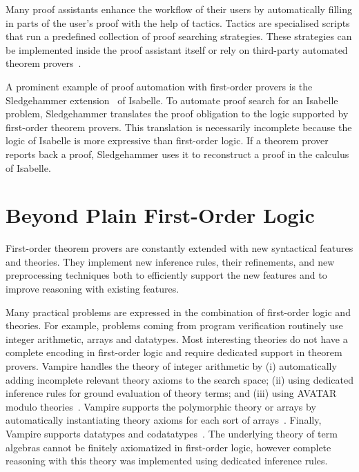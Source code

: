 Many proof assistants enhance the workflow of their users by automatically filling in parts of the user's proof with the help of tactics. Tactics are specialised scripts that run a predefined collection of proof searching strategies. These strategies can be implemented inside the proof assistant itself or rely on third-party automated theorem provers~\cite{Sledgehammer,DBLP:conf/icms/UrbanHV10}.

A prominent example of proof automation with first-order provers is the Sledgehammer extension~\cite{Sledgehammer} of Isabelle. To automate proof search for an Isabelle problem, Sledgehammer translates the proof obligation to the logic supported by first-order theorem provers. This translation is necessarily incomplete because the logic of Isabelle is more expressive than first-order logic. If a theorem prover reports back a proof, Sledgehammer uses it to reconstruct a proof in the calculus of Isabelle.

\section*{Beyond Plain First-Order Logic}
First-order theorem provers are constantly extended with new syntactical features and theories. They implement new inference rules, their refinements, and new preprocessing techniques both to efficiently support the new features and to improve reasoning with existing features.

Many practical problems are expressed in the combination of first-order logic and theories. For example, problems coming from program verification routinely use integer arithmetic, arrays and datatypes. Most interesting theories do not have a complete encoding in first-order logic and require dedicated support in theorem provers. Vampire handles the theory of integer arithmetic by (i) automatically adding incomplete relevant theory axioms to the search space; (ii) using dedicated inference rules for ground evaluation of theory terms; and (iii) using AVATAR modulo theories~\cite{DBLP:conf/gcai/RegerB0V16}. Vampire supports the polymorphic theory or arrays by automatically instantiating theory axioms for each sort of arrays~\cite{VampireAndFOOL}. Finally, Vampire supports datatypes and co\-data\-types~\cite{BPR18}. The underlying theory of term algebras cannot be finitely axiomatized in first-order logic, however complete reasoning with this theory was implemented using dedicated inference rules.

